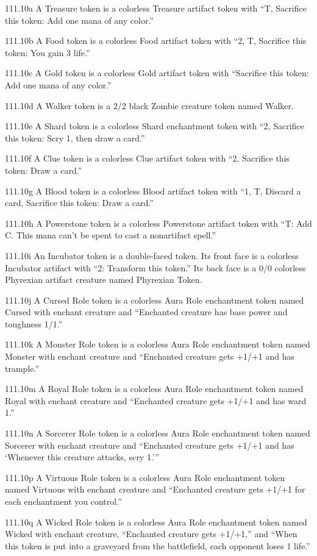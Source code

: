 111.10a A Treasure token is a colorless Treasure artifact token with “{T}, Sacrifice this token: Add one mana of any color.”

111.10b A Food token is a colorless Food artifact token with “{2}, {T}, Sacrifice this token: You gain 3 life.”

111.10c A Gold token is a colorless Gold artifact token with “Sacrifice this token: Add one mana of any color.”

111.10d A Walker token is a 2/2 black Zombie creature token named Walker.

111.10e A Shard token is a colorless Shard enchantment token with “{2}, Sacrifice this token: Scry 1, then draw a card.”

111.10f A Clue token is a colorless Clue artifact token with “{2}, Sacrifice this token: Draw a card.”

111.10g A Blood token is a colorless Blood artifact token with “{1}, {T}, Discard a card, Sacrifice this token: Draw a card.”

111.10h A Powerstone token is a colorless Powerstone artifact token with “{T}: Add {C}. This mana can’t be spent to cast a nonartifact spell.”

111.10i An Incubator token is a double-faced token. Its front face is a colorless Incubator artifact with “{2}: Transform this token.” Its back face is a 0/0 colorless Phyrexian artifact creature named Phyrexian Token.

111.10j A Cursed Role token is a colorless Aura Role enchantment token named Cursed with enchant creature and “Enchanted creature has base power and toughness 1/1.”

111.10k A Monster Role token is a colorless Aura Role enchantment token named Monster with enchant creature and “Enchanted creature gets +1/+1 and has trample.”

111.10m A Royal Role token is a colorless Aura Role enchantment token named Royal with enchant creature and “Enchanted creature gets +1/+1 and has ward {1}.”

111.10n A Sorcerer Role token is a colorless Aura Role enchantment token named Sorcerer with enchant creature and “Enchanted creature gets +1/+1 and has ‘Whenever this creature attacks, scry 1.’”

111.10p A Virtuous Role token is a colorless Aura Role enchantment token named Virtuous with enchant creature and “Enchanted creature gets +1/+1 for each enchantment you control.”

111.10q A Wicked Role token is a colorless Aura Role enchantment token named Wicked with enchant creature, “Enchanted creature gets +1/+1,” and “When this token is put into a graveyard from the battlefield, each opponent loses 1 life.”

